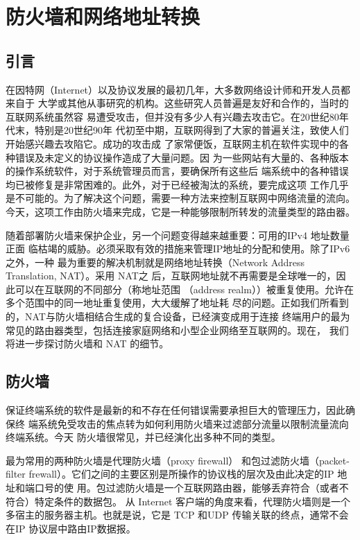 \chapter{防火墙和网络地址转换}
\minitoc

\section{引言}

在因特网（Internet）以及协议发展的最初几年，大多数网络设计师和开发人员都来自于
大学或其他从事研究的机构。这些研究人员普遍是友好和合作的，当时的互联网系统虽然容
易遭受攻击，但并没有多少人有兴趣去攻击它。在20世纪80年代末，特别是20世纪90年
代初至中期，互联网得到了大家的普遍关注，致使人们开始感兴趣去攻陷它。成功的攻击成
了家常便饭，互联网主机在软件实现中的各种错误及未定义的协议操作造成了大量问题。因
为一些网站有大量的、各种版本的操作系统软件，对于系统管理员而言，要确保所有这些后
端系统中的各种错误均已被修复是非常困难的。此外，对于已经被淘汰的系统，要完成这项
工作几乎是不可能的。为了解决这个问题，需要一种方法来控制互联网中网络流量的流向。
今天，这项工作由防火墙来完成，它是一种能够限制所转发的流量类型的路由器。

随着部署防火墙来保护企业，另一个问题变得越来越重要：可用的IPv4 地址数量正面
临枯竭的威胁。必须采取有效的措施来管理IP地址的分配和使用。除了IPv6之外，一种
最为重要的解决机制就是网络地址转换（Network Address Translation, NAT）。采用 NAT之
后，互联网地址就不再需要是全球唯一的，因此可以在互联网的不同部分（称地址范围
（address realm））被重复使用。允许在多个范围中的同一地址重复使用，大大缓解了地址耗
尽的问题。正如我们所看到的，NAT与防火墙相结合生成的复合设备，已经演变成用于连接
终端用户的最为常见的路由器类型，包括连接家庭网络和小型企业网络至互联网的。现在，
我们将进一步探讨防火墙和 NAT 的细节。

\section{防火墙}

保证终端系统的软件是最新的和不存在任何错误需要承担巨大的管理压力，因此确保终
端系统免受攻击的焦点转为如何利用防火墙来过滤部分流量以限制流量流向终端系统。今天
防火墙很常见，并已经演化出多种不同的类型。

最为常用的两种防火墙是代理防火墙（proxy firewall） 和包过滤防火墙（packet-filter
frewall）。它们之间的主要区别是所操作的协议栈的层次及由此决定的IP 地址和端口号的使
用。包过滤防火墙是一个互联网路由器，能够丢弃符合（或者不符合）特定条件的数据包。
从 Internet 客户端的角度来看，代理防火墙则是一个多宿主的服务器主机。也就是说，它是
TCP 和UDP 传输关联的终点，通常不会在IP 协议层中路由IP数据报。

